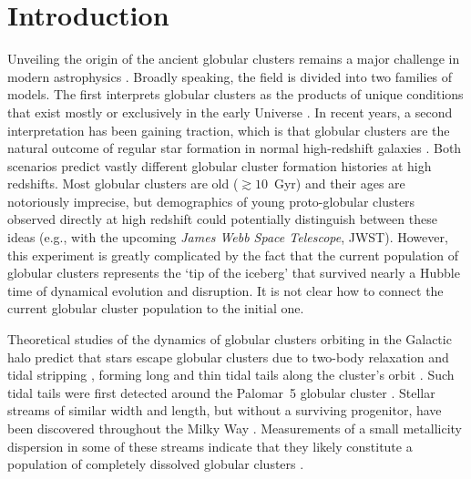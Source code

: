 \documentclass[twocolumn]{aastex63}
\begin{document}
\section{Introduction}
\label{sec:intro}

Unveiling the origin of the ancient globular clusters remains a major challenge in modern astrophysics \citep[e.g.][]{brodie:2006,kruijssen:2014,forbes:2018,adamo:2020}.
Broadly speaking, the field is divided into two families of models.
The first interprets globular clusters as the products of unique conditions that exist mostly or exclusively in the early Universe \citep[e.g.][]{peebles:1968,fall:1985,ashman:1992,trenti:2015,madau:2020}.
In recent years, a second interpretation has been gaining traction, which is that globular clusters are the natural outcome of regular star formation in normal high-redshift galaxies \citep[e.g.][]{kravtsov:2005,kruijssen15b,pfeffer:2018,keller:2020}.
Both scenarios predict vastly different globular cluster formation histories at high redshifts.
Most globular clusters are old ($\gtrsim10$~Gyr) and their ages are notoriously imprecise, but demographics of young proto-globular clusters observed directly at high redshift could potentially distinguish between these ideas (e.g., with the upcoming \textit{James Webb Space Telescope}, JWST).
However, this experiment is greatly complicated by the fact that the current population of globular clusters represents the `tip of the iceberg' that survived nearly a Hubble time of dynamical evolution and disruption.
It is not clear how to connect the current globular cluster population to the initial one.

Theoretical studies of the dynamics of globular clusters orbiting in the Galactic halo predict that stars escape globular clusters due to two-body relaxation and tidal stripping \citep[often referred to as `evaporation', e.g.,][]{spitzer:1987, baumgardt03}, forming long and thin tidal tails along the cluster's orbit \citep{combes:1999}.
Such tidal tails were first detected around the Palomar~5 globular cluster \citep{odenkirchen:2001, rockosi:2002}.
Stellar streams of similar width and length, but without a surviving progenitor, have been discovered throughout the Milky Way \citep[e.g.,][]{gd:2006, grillmair:2009, bonaca:2012, shipp:2018, ibata:2019}.
Measurements of a small metallicity dispersion in some of these streams indicate that they likely constitute a population of completely dissolved globular clusters \citep{bonaca:2020b, hansen:2020, ji:2020}.
\end{document}

